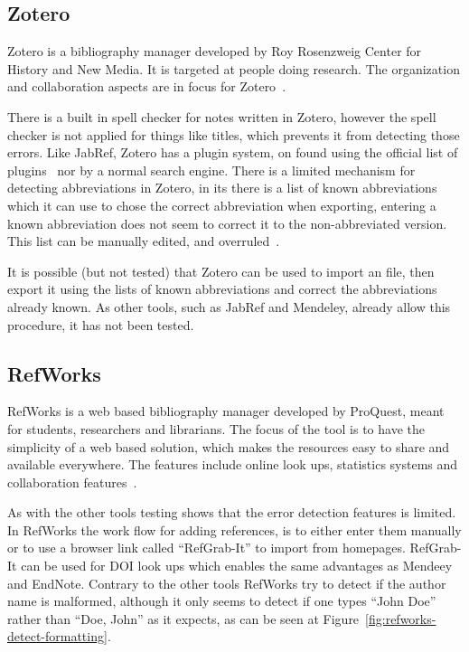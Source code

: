 \subsection{Zotero}

Zotero is a bibliography manager developed by Roy Rosenzweig Center
for History and New Media.  It is targeted at people doing research.
The organization and collaboration aspects are in focus for
Zotero~\cite{zotero_features}.

There is a built in spell checker for notes written in Zotero, however
the spell checker is not applied for things like titles, which
prevents it from detecting those errors.  Like JabRef, Zotero has a
plugin system, on found using the official list of
plugins~\cite{zotero_plugins} nor by a normal search engine. There is
a limited mechanism for detecting abbreviations in Zotero, in its
 there is a list of known abbreviations which it can use to
chose the correct abbreviation when exporting, entering a known
abbreviation does not seem to correct it to the non-abbreviated
version.  This list can be manually edited, and
overruled~\cite{zotero_abbreviations}.

It is possible (but not tested) that Zotero can be used to import an
{\bibtex} file, then export it using the lists of known abbreviations
and correct the abbreviations already known.  As other tools, such as
JabRef and Mendeley, already allow this procedure, it has not been
tested.


\subsection{RefWorks}
RefWorks is a web based bibliography manager developed by ProQuest,
meant for students, researchers and librarians.  The focus of the tool
is to have the simplicity of a web based solution, which makes the
resources easy to share and available everywhere.  The features
include online look ups, statistics systems and collaboration
features~\cite{refworks_features}.

As with the other tools testing shows that the error detection
features is limited.  In RefWorks the work flow for adding references,
is to either enter them manually or to use a browser link called
``RefGrab-It'' to import from homepages.  RefGrab-It can be used for
DOI look ups which enables the same advantages as Mendeey and EndNote.
Contrary to the other tools RefWorks try to detect if the author name
is malformed, although it only seems to detect if one types ``John
Doe'' rather than ``Doe, John'' as it expects, as can be seen at
Figure~\ref{fig:refworks-detect-formatting}.

